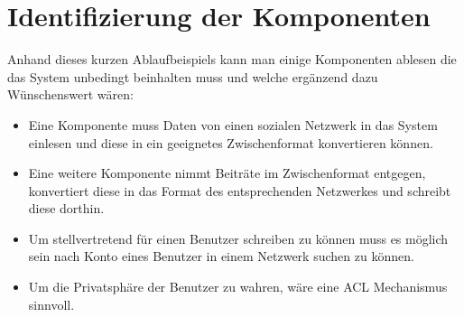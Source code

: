 
\section{Identifizierung der Komponenten} %
\label{sec:identifizierung_der_komponenten}

Anhand dieses kurzen Ablaufbeispiels kann man einige Komponenten ablesen die das System unbedingt beinhalten muss und welche ergänzend dazu Wünschenswert wären:

\begin{itemize} 
    \item Eine Komponente muss Daten von einen sozialen Netzwerk in das System einlesen und diese in ein geeignetes Zwischenformat konvertieren können.
    \item Eine weitere Komponente nimmt Beiträte im Zwischenformat entgegen, konvertiert diese in das Format des entsprechenden Netzwerkes und schreibt diese dorthin.
    \item Um stellvertretend für einen Benutzer schreiben zu können muss es möglich sein nach Konto eines Benutzer in einem Netzwerk suchen zu können.
    \item Um die Privatsphäre der Benutzer zu wahren, wäre eine ACL Mechanismus sinnvoll.
\end{itemize}   


